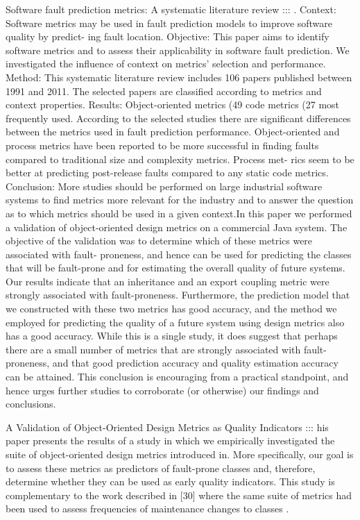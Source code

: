 Software fault prediction metrics: A systematic literature review ::: \cite{b7radjenovic2013software}. Context: Software metrics may be used in fault prediction models to improve software quality by predict-
ing fault location.
Objective: This paper aims to identify software metrics and to assess their applicability in software fault
prediction. We investigated the influence of context on metrics’ selection and performance.
Method: This systematic literature review includes 106 papers published between 1991 and 2011. The
selected papers are classified according to metrics and context properties.
Results: Object-oriented metrics (49%
code metrics (27%
most frequently used. According to the selected studies there are significant differences between the
metrics used in fault prediction performance. Object-oriented and process metrics have been reported
to be more successful in finding faults compared to traditional size and complexity metrics. Process met-
rics seem to be better at predicting post-release faults compared to any static code metrics.
Conclusion: More studies should be performed on large industrial software systems to find metrics more
relevant for the industry and to answer the question as to which metrics should be used in a given
context.In this paper we performed a validation of object-oriented design metrics on a commercial Java system.
The objective of the validation was to determine which of these metrics were associated with fault-
proneness, and hence can be used for predicting the classes that will be fault-prone and for estimating
the overall quality of future systems. Our results indicate that an inheritance and an export coupling
metric were strongly associated with fault-proneness. Furthermore, the prediction model that we
constructed with these two metrics has good accuracy, and the method we employed for predicting the
quality of a future system using design metrics also has a good accuracy.
While this is a single study, it does suggest that perhaps there are a small number of metrics that are
strongly associated with fault-proneness, and that good prediction accuracy and quality estimation
accuracy can be attained. This conclusion is encouraging from a practical standpoint, and hence urges
further studies to corroborate (or otherwise) our findings and conclusions.



A Validation of Object-Oriented Design Metrics as Quality Indicators ::: his paper presents the results of a study in which we empirically investigated the suite of object-oriented design metrics introduced in. More specifically, our goal is to assess these metrics as predictors of fault-prone classes and, therefore, determine whether they can be used as early quality indicators. This study is complementary to the work described in [30] where the same suite of metrics had been used to assess frequencies of maintenance changes to classes \cite{b11basili1996validation}.

